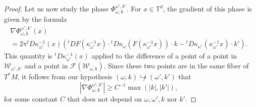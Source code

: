 \documentclass[AHL,Unicode,longabstracts,published]{cedram}
\newcommand{\p}[1]{\left(#1\right)}
\newcommand{\va}[1]{\left|#1\right|}
\newcommand{\clF}{\mathcal{F}}
\newcommand{\clW}{\mathcal{W}}
\newcommand{\bbT}{\mathbb{T}}
\begin{document}
\begin{proof}
Let us now study the phase $\Phi_{\omega,k}^{\omega',k'}$. For $x \in \bbT^d$, the gradient of this phase is given by the formula
\begin{multline*}
\nabla \Phi_{\omega,k}^{\omega',k'}(x) \\ = 2 \pi {}^t D \kappa_{\omega'}^{-1} (x)\p{{}^t D F \left(\kappa_{\omega'}^{-1} x\right) \cdot {}^t D \kappa_{\omega} \left(F\left(\kappa_{\omega'}^{-1} x\right)\right)\cdot k - {}^t D \kappa_{\omega'}\left(\kappa_{\omega'}^{-1}x\right) \cdot k'}.
\end{multline*}
This quantity is ${}^t D \kappa_{\omega'}^{-1} (x)$ applied to the difference of a point of a point in $\clW_{\omega',k'}$ and a point in $\clF(\clW_{\omega,k})$. Since these two points are in the same fiber of $T^* M$, it follows from our hypothesis $(\omega,k) \not\hookrightarrow (\omega',k')$ that
\begin{equation}\label{eq:lower_bound_phase}
\va{\nabla \Phi_{\omega,k}^{\omega',k'}} \geq C^{-1} \max(\va{k},\va{k'}),
\end{equation}
for some constant $C$ that does not depend on $\omega,\omega',k$ nor $k'$.


\end{proof}
\end{document}
